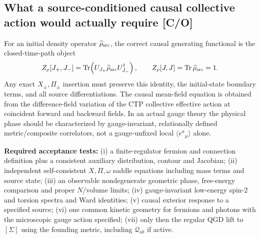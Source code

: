 \documentclass[11pt,a4paper]{article}
\begin{document}
\subsection{What a source-conditioned causal collective action would actually require [C/O]}
\label{sec:v15-CTP}
For an initial density operator $\widehat\rho_{\rm src}$, the correct causal generating functional is the closed-time-path object
\begin{equation}\label{eq:v15-CTP}
Z_{\rho}[J_+,J_-]=\operatorname{Tr}\!\left(U_{J_+}\widehat\rho_{\rm src}U^\dagger_{J_-}\right),\qquad Z_{\rho}[J,J]=\operatorname{Tr}\widehat\rho_{\rm src}=1.
\end{equation}
Any exact $X_\pm,\Pi_\pm$ insertion must preserve this identity, the initial-state boundary terms, and all source differentiations. The causal mean-field equation is obtained from the difference-field variation of the CTP collective effective action at coincident forward and backward fields. In an actual gauge theory the physical phase should be characterized by gauge-invariant, relationally defined metric/composite correlators, not a gauge-unfixed local $\langle e^a{}_{\mu}\rangle$ alone.

\textbf{Required acceptance tests:} (i) a finite-regulator fermion and connection definition plus a consistent auxiliary distribution, contour and Jacobian; (ii) independent self-consistent $X,\Pi,\omega$ saddle equations including mass terms and source state; (iii) an observable nondegenerate geometric phase, free-energy comparison and proper $N$/volume limits; (iv) gauge-invariant low-energy spin-2 and torsion spectra and Ward identities; (v) causal exterior response to a specified source; (vi) one common kinetic geometry for fermions and photons with the microscopic gauge action specified; (vii) only then the regular QGD lift to $[\Sigma]$ using the founding metric, including $\mathcal Q_{ab}$ if active.
\end{document}
